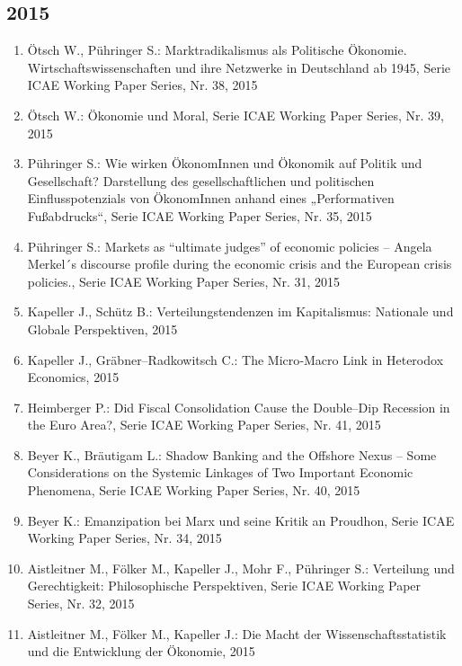 \subsection*{2015}
\begin{enumerate}
    	 \item Ötsch W., Pühringer S.: Marktradikalismus als Politische Ökonomie. Wirtschaftswissenschaften und ihre Netzwerke in Deutschland ab 1945, Serie ICAE Working Paper Series, Nr. 38, 2015
	 \item Ötsch W.: Ökonomie und Moral, Serie ICAE Working Paper Series, Nr. 39, 2015
	 \item Pühringer S.: Wie wirken ÖkonomInnen und Ökonomik auf Politik und Gesellschaft? Darstellung des gesellschaftlichen und politischen Einflusspotenzials von ÖkonomInnen anhand eines „Performativen Fußabdrucks“, Serie ICAE Working Paper Series, Nr. 35, 2015
	 \item Pühringer S.: Markets as “ultimate judges” of economic policies -- Angela Merkel´s discourse profile during the economic crisis and the European crisis policies., Serie ICAE Working Paper Series, Nr. 31, 2015
	 \item Kapeller J., Schütz B.: Verteilungstendenzen im Kapitalismus: Nationale und Globale Perspektiven, 2015
	 \item Kapeller J., Gräbner--Radkowitsch C.: The Micro‐Macro Link in Heterodox Economics, 2015
	 \item Heimberger P.: Did Fiscal Consolidation Cause the Double--Dip Recession in the Euro Area?, Serie ICAE Working Paper Series, Nr. 41, 2015
	 \item Beyer K., Bräutigam L.: Shadow Banking and the Offshore Nexus -- Some Considerations on the Systemic Linkages of Two Important Economic Phenomena, Serie ICAE Working Paper Series, Nr. 40, 2015
	 \item Beyer K.: Emanzipation bei Marx und seine Kritik an Proudhon, Serie ICAE Working Paper Series, Nr. 34, 2015
	 \item Aistleitner M., Fölker M., Kapeller J., Mohr F., Pühringer S.: Verteilung und Gerechtigkeit: Philosophische Perspektiven, Serie ICAE Working Paper Series, Nr. 32, 2015
	 \item Aistleitner M., Fölker M., Kapeller J.: Die Macht der Wissenschaftsstatistik und die Entwicklung der Ökonomie, 2015
\end{enumerate}
